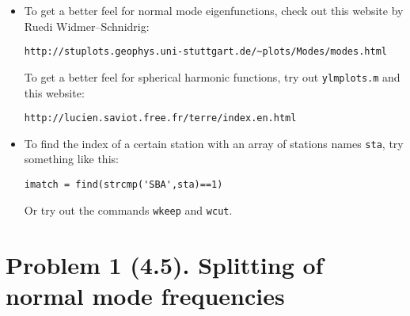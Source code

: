 \documentclass[11pt,titlepage,fleqn]{article}
\begin{document}
\begin{spacing}{1.0}
\begin{itemize}
\begin{itemize}
\item instrument response and Fourier analysis: \citet[][Ch.~6]{SteinWysession}
\item directivity: \citet[][Section 4.3.2]{SteinWysession} 
\item Sumatra earthquake: \citet{Lay2005,Ammon2005,Park2005,Ni2005,SSteinOkal2007}
\item normal modes: \citet[][Section 2.9]{SteinWysession} and \citet[][Ch.~8]{DT}. See also ``Computational details'' in Section 10.5.1 of DT.
\item PDFs of all referenced Sumatra papers can be found in one of two directories:
%
\begin{verbatim}
/home/admin/databases/SUMATRA/papers/
/home/admin/databases/SUMATRA/papers/SCIENCE_2005/
\end{verbatim}

\end{itemize}


\item To get a better feel for normal mode eigenfunctions, check out this website by Ruedi Widmer--Schnidrig:
%
\begin{verbatim}
http://stuplots.geophys.uni-stuttgart.de/~plots/Modes/modes.html
\end{verbatim}
%
To get a better feel for spherical harmonic functions, try out \verb+ylmplots.m+ and this website:
%
\begin{verbatim}
http://lucien.saviot.free.fr/terre/index.en.html
\end{verbatim}


\item To find the index of a certain station with an array of stations names \verb+sta+, try something like this:
%
\begin{verbatim}
imatch = find(strcmp('SBA',sta)==1)
\end{verbatim}
%
Or try out the commands \verb+wkeep+ and \verb+wcut+.

\end{itemize}

\end{spacing}


\section*{Problem 1 (4.5). Splitting of normal mode frequencies}
\end{document}
